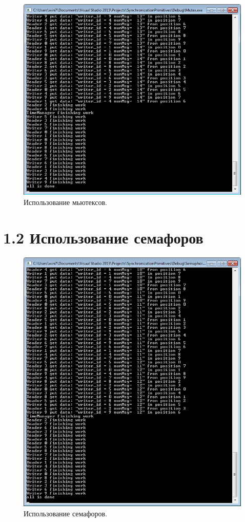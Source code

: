 \documentclass[a4paper,12pt]{article} %
\begin{document}
\begin{figure}[h!]
\centering
\includegraphics[scale=1]{res/001}
\caption{Использование мьютексов.}
\end{figure}

\newpage

\section*{1.2 Использование семафоров}

\begin{figure}[h!]
\centering
\includegraphics[scale=1]{res/002}
\caption{Использование семафоров.}
\end{figure}
\end{document}
